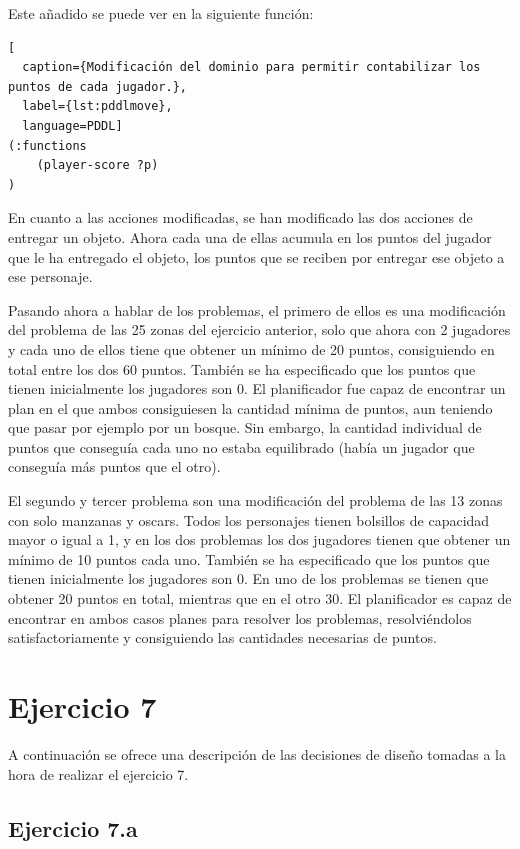 \documentclass[11pt,a4paper]{article}
\begin{document}
Este añadido se puede ver en la siguiente función:

\begin{algorithm}[H]
\begin{lstlisting}[
  caption={Modificación del dominio para permitir contabilizar los puntos de cada jugador.},
  label={lst:pddlmove},
  language=PDDL]
(:functions
    (player-score ?p)
)
\end{lstlisting}
\end{algorithm}

En cuanto a las acciones modificadas, se han modificado las dos acciones de entregar un objeto. Ahora cada una de ellas acumula en los
puntos del jugador que le ha entregado el objeto, los puntos que se reciben por entregar ese objeto a ese personaje.

Pasando ahora a hablar de los problemas, el primero de ellos es una modificación del problema de las 25 zonas del ejercicio anterior,
solo que ahora con 2 jugadores y cada uno de ellos tiene que obtener un mínimo de 20 puntos, consiguiendo en total entre los dos
60 puntos. También se ha especificado que los puntos que tienen inicialmente los jugadores son 0.
El planificador fue capaz de encontrar un plan en el que ambos consiguiesen la cantidad mínima de puntos, aun teniendo
que pasar por ejemplo por un bosque. Sin embargo, la cantidad individual de puntos que conseguía cada uno no estaba equilibrado (había
un jugador que conseguía más puntos que el otro).

El segundo y tercer problema son una modificación del problema de las 13 zonas con solo manzanas y oscars. Todos los personajes tienen
bolsillos de capacidad mayor o igual a 1, y en los dos problemas los dos jugadores tienen que obtener un mínimo de 10 puntos cada uno.
También se ha especificado que los puntos que tienen inicialmente los jugadores son 0.
En uno de los problemas se tienen que obtener 20 puntos en total, mientras que en el otro 30. El planificador es capaz de encontrar
en ambos casos planes para resolver los problemas, resolviéndolos satisfactoriamente y consiguiendo las cantidades necesarias de
puntos.

\section{Ejercicio 7}

A continuación se ofrece una descripción de las decisiones de diseño tomadas a la hora de realizar el ejercicio 7.

\subsection{Ejercicio 7.a}
\end{document}
